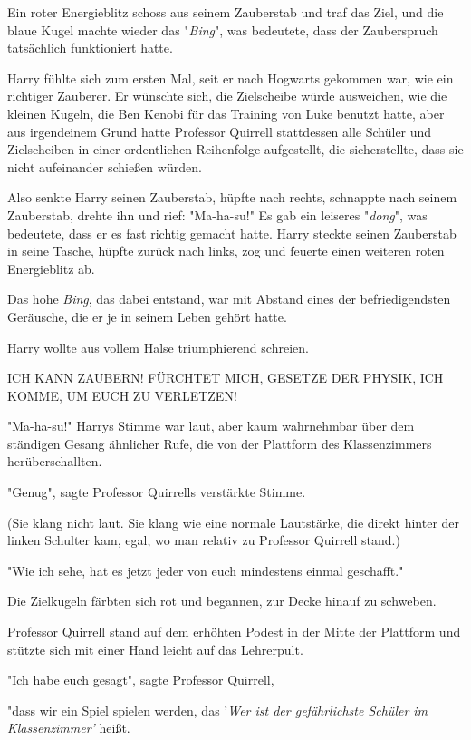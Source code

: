 {Ein roter Energieblitz schoss aus seinem Zauberstab und traf das Ziel, und die blaue Kugel machte wieder das "\emph{Bing}", was bedeutete, dass der Zauberspruch tatsächlich funktioniert hatte.

Harry fühlte sich zum ersten Mal, seit er nach Hogwarts gekommen war, wie ein richtiger Zauberer. Er wünschte sich, die Zielscheibe würde ausweichen, wie die kleinen Kugeln, die Ben Kenobi für das Training von Luke benutzt hatte, aber aus irgendeinem Grund hatte Professor Quirrell stattdessen alle Schüler und Zielscheiben in einer ordentlichen Reihenfolge aufgestellt, die sicherstellte, dass sie nicht aufeinander schießen würden.

Also senkte Harry seinen Zauberstab, hüpfte nach rechts, schnappte nach seinem Zauberstab, drehte ihn und rief: "Ma-ha-su!" Es gab ein leiseres "\emph{dong}", was bedeutete, dass er es fast richtig gemacht hatte. Harry steckte seinen Zauberstab in seine Tasche, hüpfte zurück nach links, zog und feuerte einen weiteren roten Energieblitz ab.

Das hohe \emph{Bing}, das dabei entstand, war mit Abstand eines der befriedigendsten Geräusche, die er je in seinem Leben gehört hatte.

Harry wollte aus vollem Halse triumphierend schreien.

ICH KANN ZAUBERN! FÜRCHTET MICH, GESETZE DER PHYSIK, ICH KOMME, UM EUCH ZU VERLETZEN!

"Ma-ha-su!" Harrys Stimme war laut, aber kaum wahrnehmbar über dem ständigen Gesang ähnlicher Rufe, die von der Plattform des Klassenzimmers herüberschallten.

"Genug", sagte Professor Quirrells verstärkte Stimme.

(Sie klang nicht laut. Sie klang wie eine normale Lautstärke, die direkt hinter der linken Schulter kam, egal, wo man relativ zu Professor Quirrell stand.)

"Wie ich sehe, hat es jetzt jeder von euch mindestens einmal geschafft."

Die Zielkugeln färbten sich rot und begannen, zur Decke hinauf zu schweben.

Professor Quirrell stand auf dem erhöhten Podest in der Mitte der Plattform und stützte sich mit einer Hand leicht auf das Lehrerpult.

"Ich habe euch gesagt", sagte Professor Quirrell,

"dass wir ein Spiel spielen werden, das '\emph{Wer ist der gefährlichste Schüler im Klassenzimmer'} heißt.

}
